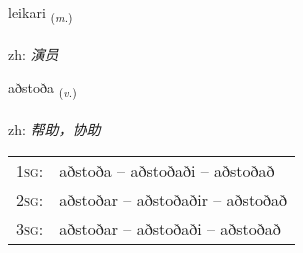 \documentclass[frontgrid, backgrid]{flacards}\usepackage[]{graphicx}\usepackage[]{color}
\begin{document}
\renewcommand{\blhead}{\vskip5pt {\small\bfseries\footnotesize Nafnorð | 名词 }}
\renewcommand{\bcfoot}{\vskip5pt \hspace{2pt}{\small\bfseries\footnotesize 2K}}


{leikari \small{\textsubscript{(\textit{m.})}} \\[1ex] %
\textphonetic{[leiːkarɪ]} \\
zh: \emph{演员} \\  [2ex]
\renewcommand*{\arraystretch}{0.8}
}

\renewcommand{\flhead}{\vskip5pt \fboxsep=0pt {\small\bfseries\footnotesize Sagnorð | 动词}}
\renewcommand{\fcfoot}{\vskip5pt \fboxsep=0pt \hspace{2pt}{\small\bfseries\footnotesize 2K}}

\renewcommand{\blhead}{\vskip5pt {\small\bfseries\footnotesize Sagnorð | 动词 }}
\renewcommand{\bcfoot}{\vskip5pt \hspace{2pt}{\small\bfseries\footnotesize 2K}}


{aðstoða \small{\textsubscript{(\textit{v.})}} \\[1ex] %
\textphonetic{[aðstɔða]} \\
zh: \emph{帮助，协助} \\  [2ex]
\renewcommand*{\arraystretch}{0.8}
\begin{tabular}{p{1cm}l}
\textsc{1sg}: & aðstoða -- aðstoðaði -- aðstoðað \\ 
\textsc{2sg}: & aðstoðar -- aðstoðaðir -- aðstoðað \\ 
\textsc{3sg}: & aðstoðar -- aðstoðaði -- aðstoðað \\ 
\end{tabular}
}
\end{document}
